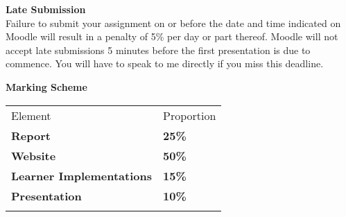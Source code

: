 \textbf{Late Submission}\\
Failure to submit your assignment on or before the date and time indicated on Moodle will result in a penalty of 5\% per day or part thereof.  Moodle will not accept late submissions 5 minutes before the first presentation is due to commence.  You will have to speak to me directly if you miss this deadline.

\vspace{0.5cm}
\textbf{Marking Scheme}\\

\begin{table}[h!]
     \begin{center}
     \begin{tabular}{p{5cm}  p{5cm} }
     \toprule
      \textbf\large{Element} & \textbf\large{Proportion} \\ 
    \cmidrule(r){1-1}\cmidrule(lr){2-2}
      \textbf{Report} & \textbf{25\%}\\
      \textbf{Website} & \textbf{50\%}\\
      \textbf{Learner Implementations} & \textbf{15\%}\\      
      \textbf{Presentation} & \textbf{10\%}\\     
      \\ \bottomrule
      \end{tabular}
      \label{tbl:markSchemeAsmt3}
      \end{center}
 \end{table}

